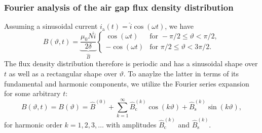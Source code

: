 \begin{frame}
	\frametitle{Fourier analysis of the air gap flux density distribution}
        Assuming a sinusoidal current $i_\mathrm{a}(t) = \hat{i} \cos(\omega t)$, we have
        \begin{equation}
            B(\vartheta, t) = \underbrace{\frac{\mu_0 N \hat{i}}{2\delta}}_{\hat{B}} \begin{cases}
                \cos(\omega t) & \text{for } -\pi/2 \leq \vartheta < \pi/2, \\
                -\cos(\omega t) & \text{for } \pi/2 \leq \vartheta < 3\pi/2.
            \end{cases}
            \label{eq:B_single_phase_coil}
        \end{equation}
        The flux density distribution therefore is periodic and has a sinusoidal shape over $t$ as well as a rectangular shape over $\vartheta$. To anaylze the latter in terms of its fundamental and harmonic components, we utilize the Fourier series expansion for some arbitrary $t$:
        \begin{equation}
            B(\vartheta, t) =B(\vartheta) = \hat{B}^{(0)} + \sum_{k=1}^{\infty} \hat{B}_{\mathrm{c}}^{(k)} \cos(k \vartheta) + \hat{B}_{\mathrm{s}}^{(k)} \sin(k \vartheta),
            \label{eq:fourier_series_B_single_phase_coil}
        \end{equation} 
        for harmonic order $k=1,2,3,\ldots$ with amplitudes $\hat{B}_{\mathrm{c}}^{(k)}$ and $\hat{B}_{\mathrm{s}}^{(k)}$. 
\end{frame}

